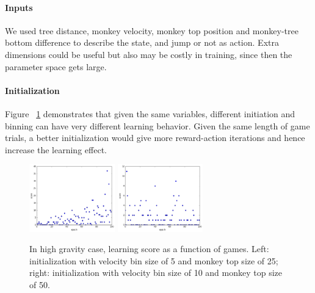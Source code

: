 \documentclass[11pt]{article}
\begin{document}
\paragraph{Inputs} We used tree distance, monkey velocity, monkey top position and monkey-tree bottom difference to describe the state, and jump or not as action. Extra dimensions could be useful but also may be costly in training, since then the parameter space gets large. 
\paragraph{Initialization}Figure ~\ref{QInitial} demonstrates that given the same variables, different initiation and binning can have very different learning behavior. Given the same length of game trials, a better initialization would give more reward-action iterations and hence increase the learning effect.
\begin{figure}[] 
\centering
        \includegraphics[width=0.33\textwidth]{Plot/learn_vel5_mtop25.png}
        \includegraphics[width=0.33\textwidth]{Plot/learn_vel10_mtop50.png}
        \caption{In high gravity case, learning score as a function of games. Left: initialization with velocity bin size of 5 and monkey top size of 25; right: initialization with velocity bin size of 10 and monkey top size of 50.}
            \label{QInitial}
\end{figure}
\end{document}
